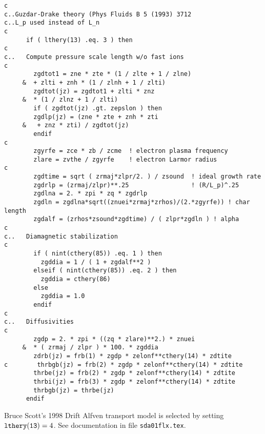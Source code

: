 \begin{verbatim}
c
c..Guzdar-Drake theory (Phys Fluids B 5 (1993) 3712
c..L_p used instead of L_n
c
      if ( lthery(13) .eq. 3 ) then
c
c..   Compute pressure scale length w/o fast ions
c
        zgdtot1 = zne * zte * (1 / zlte + 1 / zlne)
     &  + zlti + znh * (1 / zlnh + 1 / zlti)
        zgdtot(jz) = zgdtot1 + zlti * znz
     &  * (1 / zlnz + 1 / zlti)
        if ( zgdtot(jz) .gt. zepslon ) then
        zgdlp(jz) = (zne * zte + znh * zti
     &   + znz * zti) / zgdtot(jz)
        endif
c
        zgyrfe = zce * zb / zcme  ! electron plasma frequency
        zlare = zvthe / zgyrfe    ! electron Larmor radius
c
        zgdtime = sqrt ( zrmaj*zlpr/2. ) / zsound  ! ideal growth rate
        zgdrlp = (zrmaj/zlpr)**.25                 ! (R/L_p)^.25
        zgdlna = 2. * zpi * zq * zgdrlp
        zgdln = zgdlna*sqrt((znuei*zrmaj*zrhos)/(2.*zgyrfe)) ! char length
        zgdalf = (zrhos*zsound*zgdtime) / ( zlpr*zgdln ) ! alpha
c
c..   Diamagnetic stabilization
c
        if ( nint(cthery(85)) .eq. 1 ) then
          zgddia = 1 / ( 1 + zgdalf**2 )
        elseif ( nint(cthery(85)) .eq. 2 ) then
          zgddia = cthery(86)
        else
          zgddia = 1.0
        endif
c
c..   Diffusivities
c
        zgdp = 2. * zpi * ((zq * zlare)**2.) * znuei
     &  * ( zrmaj / zlpr ) * 100. * zgddia
        zdrb(jz) = frb(1) * zgdp * zelonf**cthery(14) * zdtite
c        thrbgb(jz) = frb(2) * zgdp * zelonf**cthery(14) * zdtite
        thrbe(jz) = frb(2) * zgdp * zelonf**cthery(14) * zdtite
        thrbi(jz) = frb(3) * zgdp * zelonf**cthery(14) * zdtite
        thrbgb(jz) = thrbe(jz)
      endif
\end{verbatim}

Bruce Scott's 1998 Drift Alfven transport model is selected by setting
${\tt lthery(13)}= 4$.
See documentation in file {\tt sda01flx.tex}.

